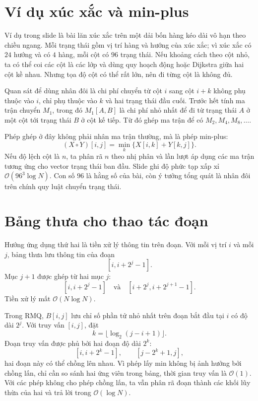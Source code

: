 \documentclass[11pt]{article}
\newcommand{\Oh}{\mathcal{O}}
\begin{document}
\section{Ví dụ xúc xắc và min-plus}

Ví dụ trong slide là bài lăn xúc xắc trên một dải bốn hàng kéo dài vô hạn theo
chiều ngang. Mỗi trạng thái gồm vị trí hàng và hướng của xúc xắc; vì xúc xắc
có \(24\) hướng và có \(4\) hàng, mỗi cột có \(96\) trạng thái. Nếu khoảng
cách theo cột nhỏ, ta có thể coi các cột là các lớp và dùng quy hoạch động
hoặc Dijkstra giữa hai cột kề nhau. Nhưng tọa độ cột có thể rất lớn, nên đi
từng cột là không đủ.

Quan sát để dùng nhân đôi là chi phí chuyển từ cột \(i\) sang cột \(i+k\)
không phụ thuộc vào \(i\), chỉ phụ thuộc vào \(k\) và hai trạng thái đầu cuối.
Trước hết tính ma trận chuyển \(M_1\), trong đó \(M_1[A,B]\) là chi phí nhỏ
nhất để đi từ trạng thái \(A\) ở một cột tới trạng thái \(B\) ở cột kế tiếp.
Từ đó ghép ma trận để có \(M_2,M_4,M_8,\ldots\).

Phép ghép ở đây không phải nhân ma trận thường, mà là phép min-plus:
\[
  (X\circ Y)[i,j]=\min_k\{X[i,k]+Y[k,j]\}.
\]
Nếu độ lệch cột là \(n\), ta phân rã \(n\) theo nhị phân và lần lượt áp dụng
các ma trận tương ứng cho vector trạng thái ban đầu. Slide ghi độ phức tạp
xấp xỉ \(\Oh(96^3\log N)\). Con số \(96\) là hằng số của bài, còn ý tưởng
tổng quát là nhân đôi trên chính quy luật chuyển trạng thái.

\section{Bảng thưa cho thao tác đoạn}

Hướng ứng dụng thứ hai là tiền xử lý thông tin trên đoạn. Với mỗi vị trí \(i\)
và mỗi \(j\), bảng thưa lưu thông tin của đoạn
\[
  [i,i+2^j-1].
\]
Mục \(j+1\) được ghép từ hai mục \(j\):
\[
  [i,i+2^j-1]\quad\text{và}\quad [i+2^j,i+2^{j+1}-1].
\]
Tiền xử lý mất \(\Oh(N\log N)\).

Trong RMQ, \(B[i,j]\) lưu chỉ số phần tử nhỏ nhất trên đoạn bắt đầu tại \(i\)
có độ dài \(2^j\). Với truy vấn \([i,j]\), đặt
\[
  k=\lfloor\log_2(j-i+1)\rfloor.
\]
Đoạn truy vấn được phủ bởi hai đoạn độ dài \(2^k\):
\[
  [i,i+2^k-1],\qquad [j-2^k+1,j],
\]
hai đoạn này có thể chồng lên nhau. Vì phép lấy min không bị ảnh hưởng bởi
chồng lấn, chỉ cần so sánh hai ứng viên trong bảng, thời gian truy vấn là
\(\Oh(1)\). Với các phép không cho phép chồng lấn, ta vẫn phân rã đoạn thành
các khối lũy thừa của hai và trả lời trong \(\Oh(\log N)\).
\end{document}
